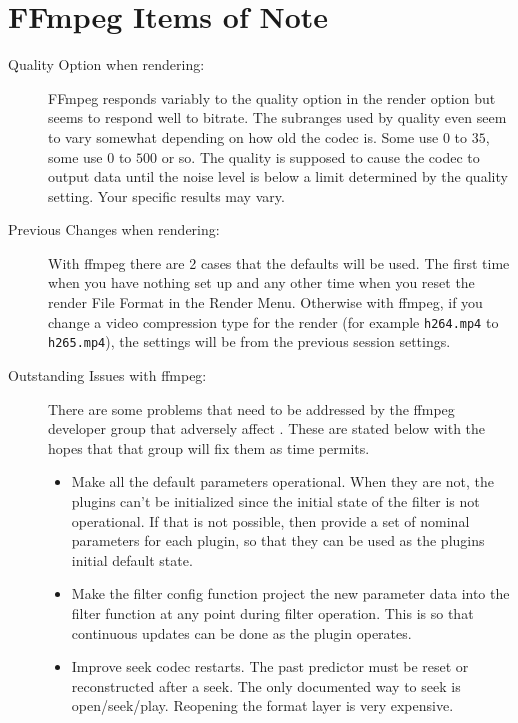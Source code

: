 \section{FFmpeg Items of Note}%
\label{sec:ffmpeg_items_note}

\begin{description}
    \item[Quality Option when rendering:] FFmpeg responds variably to the quality option in the render option but seems to respond well to bitrate. The subranges used by quality even seem to vary somewhat depending on how old the codec is. Some use $0$ to $35$, some use $0$ to $500$ or so.  The quality is supposed to cause the codec to output data until the noise level is below a limit determined by the quality setting. Your specific results may vary.
    \item[Previous Changes when rendering:] With ffmpeg there are 2 cases that the defaults will be used.  The first time when you have nothing set up and any other time when you reset the render File Format in the Render Menu.  Otherwise with ffmpeg, if you change a video compression type for the render (for example \texttt{h264.mp4} to \texttt{h265.mp4}), the settings will be from the previous session settings.
    \item[Outstanding Issues with ffmpeg:] There are some problems that need to be addressed by the ffmpeg developer group that adversely affect \CGG{}.  These are stated below with the hopes that that group will fix them as time permits.
    \begin{itemize}
        \item Make all the default parameters operational.  When they are not, the \CGG{} plugins can't be initialized since the initial state of the filter is not operational.  If that is not possible, then provide a set of nominal parameters for each plugin, so that they can be used as the plugins initial default state.
        \item Make the filter config function project the new parameter data into the filter function at any point
        during filter operation.  This is so that continuous updates can be done as the plugin operates.
        \item Improve seek codec restarts.  The past predictor must be reset or reconstructed after a seek.  The  only documented way to seek is open/seek/play.  Reopening the format layer is very expensive.
    \end{itemize}
\end{description}
